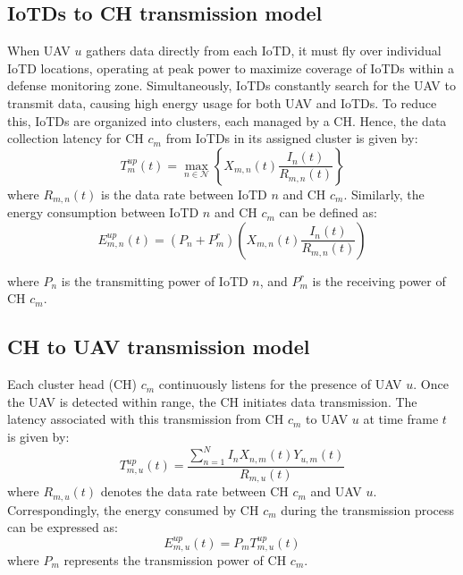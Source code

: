\documentclass[conference]{IEEEtran}
\begin{document}
\subsection{IoTDs to CH transmission model}
When UAV $u$ gathers data directly from each IoTD, it must fly over individual IoTD locations, operating at peak power to maximize coverage of IoTDs within a defense monitoring zone. Simultaneously, IoTDs constantly search for the UAV to transmit data, causing high energy usage for both UAV and IoTDs. To reduce this, IoTDs are organized into clusters, each managed by a CH.
Hence, the data collection latency for CH $c_m$ from IoTDs in its assigned cluster is given by:
\begin{equation}
    T^{up}_m(t) = \max_{n\in\mathcal{N}}\left \{ X_{m,n}(t) \frac{I_n(t)}{R_{m,n}(t)} \right \}
\end{equation}
where $R_{m,n}(t)$ is the data rate between IoTD $n$ and CH $c_m$.
Similarly, the energy consumption between IoTD $n$ and CH $c_m$ can be defined as:
\begin{equation}
    E_{m,n}^{up}(t) = (P_n + P_m^{r})\left ( X_{m,n}(t) \frac{I_n(t)}{R_{m,n}(t)} \right )
\end{equation}

where $P_n$ is the transmitting power of IoTD $n$, and $P_m^{r}$ is the receiving power of CH $c_m$.

\subsection{CH to UAV transmission model}
Each cluster head (CH) $c_m$ continuously listens for the presence of UAV $u$. Once the UAV is detected within range, the CH initiates data transmission. The latency associated with this transmission from CH $c_m$ to UAV $u$ at time frame $t$ is given by:
\begin{equation}
    T_{m,u}^{up}(t) = \frac{\sum_{n=1}^{N} I_n X_{n,m}(t) Y_{u,m}(t)}{R_{m,u}(t)}
\end{equation}
where $R_{m,u}(t)$ denotes the data rate between CH $c_m$ and UAV $u$. Correspondingly, the energy consumed by CH $c_m$ during the transmission process can be expressed as:
\begin{equation}
    E_{m,u}^{up}(t) = P_m T_{m,u}^{up}(t)
\end{equation}
where $P_m$ represents the transmission power of CH $c_m$.
\end{document}
